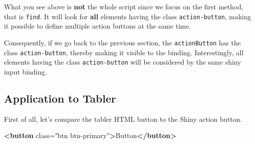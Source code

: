\documentclass[
]{book}
\newenvironment{Shaded}{\begin{snugshade}}{\end{snugshade}}
\newcommand{\AttributeTok}[1]{\textcolor[rgb]{0.77,0.63,0.00}{#1}}
\newcommand{\CommentTok}[1]{\textcolor[rgb]{0.56,0.35,0.01}{\textit{#1}}}
\newcommand{\ControlFlowTok}[1]{\textcolor[rgb]{0.13,0.29,0.53}{\textbf{#1}}}
\newcommand{\DataTypeTok}[1]{\textcolor[rgb]{0.13,0.29,0.53}{#1}}
\newcommand{\DecValTok}[1]{\textcolor[rgb]{0.00,0.00,0.81}{#1}}
\newcommand{\KeywordTok}[1]{\textcolor[rgb]{0.13,0.29,0.53}{\textbf{#1}}}
\newcommand{\NormalTok}[1]{#1}
\newcommand{\OperatorTok}[1]{\textcolor[rgb]{0.81,0.36,0.00}{\textbf{#1}}}
\newcommand{\OtherTok}[1]{\textcolor[rgb]{0.56,0.35,0.01}{#1}}
\newcommand{\StringTok}[1]{\textcolor[rgb]{0.31,0.60,0.02}{#1}}
\newcommand{\VariableTok}[1]{\textcolor[rgb]{0.00,0.00,0.00}{#1}}
\begin{document}
\begin{Shaded}
\end{Shaded}

What you see above is \textbf{not} the whole script since we focus on the first method, that is \texttt{find}. It will look for \textbf{all} elements having the class \texttt{action-button}, making it possible to define multiple action buttons at the same time.

Consequently, if we go back to the previous section, the \texttt{actionButton} has the class \texttt{action-button}, thereby making it visible to the binding. Interestingly, all elements having the class \texttt{action-button} will be considered by the same shiny input binding.

\hypertarget{application-to-tabler}{%
\subsection{Application to Tabler}\label{application-to-tabler}}

First of all, let's compare the tabler HTML button to the Shiny action button.

\begin{Shaded}
\begin{Highlighting}[]
\KeywordTok{<button}\OtherTok{ class=}\StringTok{"btn btn-primary"}\KeywordTok{>}\NormalTok{Button}\KeywordTok{</button>}
\end{Highlighting}
\end{Shaded}
\end{document}
